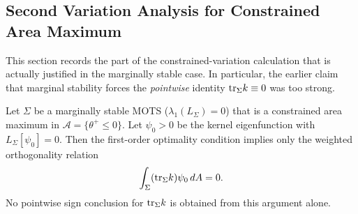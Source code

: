 \subsection{Second Variation Analysis for Constrained Area Maximum}\label{app:SecondVariation}

This section records the part of the constrained-variation calculation that is actually justified in the marginally stable case. In particular, the earlier claim that marginal stability forces the \emph{pointwise} identity $\mathrm{tr}_\Sigma k \equiv 0$ was too strong.

\begin{theorem}\label{thm:SecondVariationComplete}
Let $\Sigma$ be a marginally stable MOTS ($\lambda_1(L_\Sigma) = 0$) that is a constrained area maximum in $\mathcal{A} = \{\theta^+ \le 0\}$. Let $\psi_0 > 0$ be the kernel eigenfunction with $L_\Sigma[\psi_0] = 0$. Then the first-order optimality condition implies only the weighted orthogonality relation
\begin{equation}
    \int_\Sigma (\mathrm{tr}_\Sigma k)\psi_0\, dA = 0.
\end{equation}
No pointwise sign conclusion for $\mathrm{tr}_\Sigma k$ is obtained from this argument alone.
\end{theorem}

